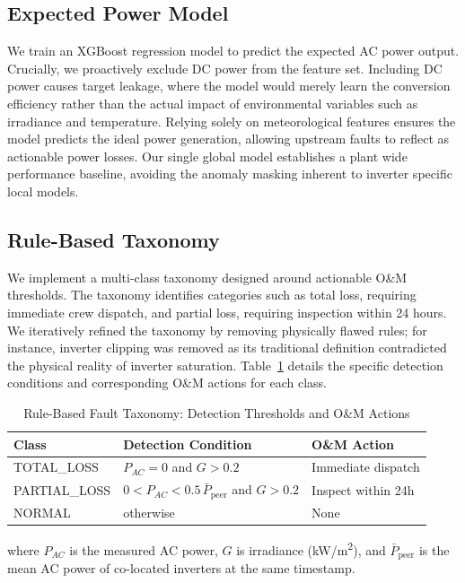 \documentclass[11pt,a4paper,twoside]{article}
\begin{document}
\subsection{Expected Power Model}
We train an XGBoost \cite{chen2016} regression model to predict the expected AC power output. Crucially, we proactively exclude DC power from the feature set. Including DC power causes target leakage, where the model would merely learn the conversion efficiency rather than the actual impact of environmental variables such as irradiance and temperature. Relying solely on meteorological features ensures the model predicts the ideal power generation, allowing upstream faults to reflect as actionable power losses. Our single global model establishes a plant wide performance baseline, avoiding the anomaly masking inherent to inverter specific local models.

\subsection{Rule-Based Taxonomy}
We implement a multi-class taxonomy designed around actionable O\&M thresholds. The taxonomy identifies categories such as total loss, requiring immediate crew dispatch, and partial loss, requiring inspection within 24 hours. We iteratively refined the taxonomy by removing physically flawed rules; for instance, inverter clipping was removed as its traditional definition contradicted the physical reality of inverter saturation. Table~\ref{tab:taxonomy_thresholds} details the specific detection conditions and corresponding O\&M actions for each class.

\begin{table}[H]
\centering
\caption{Rule-Based Fault Taxonomy: Detection Thresholds and O\&M Actions}
\label{tab:taxonomy_thresholds}
\begin{tabular}{lll}
\toprule
\textbf{Class} & \textbf{Detection Condition} & \textbf{O\&M Action} \\
\midrule
TOTAL\_LOSS & $P_{AC}=0$ and $G>0.2$ & Immediate dispatch \\
PARTIAL\_LOSS & $0 < P_{AC} < 0.5\,\bar{P}_{\text{peer}}$ and $G>0.2$ & Inspect within 24h \\
NORMAL & otherwise & None \\
\bottomrule
\end{tabular}
\end{table}

\noindent where $P_{AC}$ is the measured AC power, $G$ is irradiance (kW/m\textsuperscript{2}), and $\bar{P}_{\text{peer}}$ is the mean AC power of co-located inverters at the same timestamp.
\end{document}
